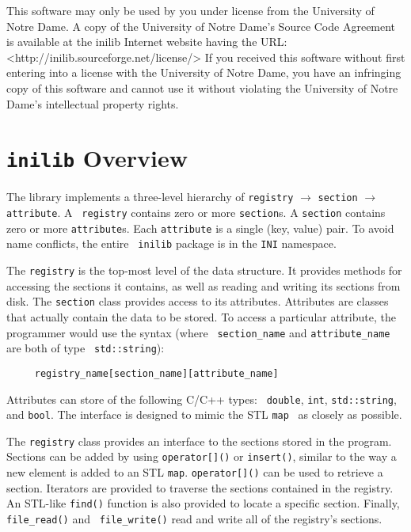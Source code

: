 %
This software may only be used by you under license from the
University of Notre Dame.  A copy of the University of Notre Dame's
Source Code Agreement is available at the inilib Internet website
having the URL: <http://inilib.sourceforge.net/license/> If you
received this software without first entering into a license with the
University of Notre Dame, you have an infringing copy of this software
and cannot use it without violating the University of Notre Dame's
intellectual property rights.
% 
%

\section[inilib Overview]{{\tt inilib} Overview}
\label{sec:overview}

The library implements a three-level hierarchy of {\tt registry}
$\rightarrow$ {\tt section} $\rightarrow$ {\tt attribute}.  A {\tt
registry} contains zero or more {\tt section}s.  A {\tt section}
contains zero or more {\tt attribute}s.  Each {\tt attribute} is a
single (key, value) pair.  To avoid name conflicts, the entire {\tt
inilib} package is in the {\tt INI} namespace.

The {\tt registry} is the top-most level of the data structure.  It
provides methods for accessing the sections it contains, as well as
reading and writing its sections from disk.  The {\tt section} class
provides access to its attributes.  Attributes are classes that
actually contain the data to be stored.  To access a particular
attribute, the programmer would use the syntax (where {\tt
section\_name} and {\tt attribute\_name} are both of type {\tt
std::string}):

\begin{verbatim}
     registry_name[section_name][attribute_name]
\end{verbatim}

Attributes can store of the following C/C++ types: {\tt
  double}, {\tt int}, {\tt std::string}, and {\tt bool}.  The
interface is designed to mimic the STL {\tt map}~\cite{STL} as closely
as possible.

The {\tt registry} class provides an interface to the sections stored
in the program.  Sections can be added by using {\tt operator[]()} or
{\tt insert()}, similar to the way a new element is added to an STL
{\tt map}.  {\tt operator[]()} can be used to retrieve a section.
Iterators are provided to traverse the sections contained in the
registry.  An STL-like {\tt find()} function is also provided to
locate a specific section.  Finally, {\tt file\_read()} and {\tt
  file\_write()} read and write all of the registry's sections.

